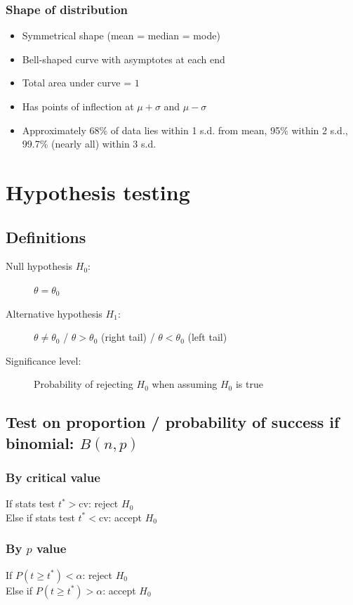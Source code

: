\documentclass[A4paper, 11pt]{article}
\begin{document}
	\subsubsection{Shape of distribution}
	\begin{itemize}
		\item Symmetrical shape (mean = median = mode)
		\item Bell-shaped curve with asymptotes at each end
		\item Total area under curve = $1$
		\item Has points of inflection at $\mu+\sigma$ and $\mu-\sigma$
		\item Approximately 68\% of data lies within 1 s.d. from mean, 95\% within 2 s.d., 99.7\% (nearly all) within 3 s.d.
	\end{itemize}
	
	
	\section{Hypothesis testing}
	\subsection{Definitions}
	\begin{description}
		\item[Null hypothesis $H_0$:] $\theta=\theta_0$
		\item[Alternative hypothesis $H_1$:] $\theta \neq \theta_0$ / $\theta>\theta_0$ (right tail) / $\theta<\theta_0$ (left tail)
		\item[Significance level:] Probability of rejecting $H_0$ when assuming $H_0$ is true
	\end{description}
	\subsection{Test on proportion / probability of success if binomial: $B(n,p)$}
	\subsubsection{By critical value}
	If stats test $t^* > \text{cv}$: reject $H_0$\\
	Else if stats test $t^* < \text{cv}$: accept $H_0$
	
	\subsubsection{By $p$ value}
	If $P(t\geq t^*) < \alpha$: reject $H_0$\\
	Else if $P(t \geq t^*) > \alpha$: accept $H_0$
	
\end{document}
